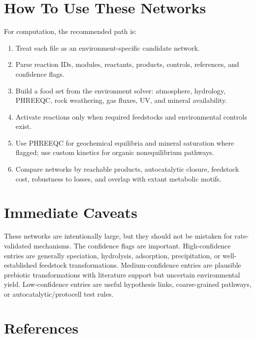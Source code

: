 \documentclass[11pt]{article}
\begin{document}
\section{How To Use These Networks}

For computation, the recommended path is:
\begin{enumerate}
\item Treat each file as an environment-specific candidate network.
\item Parse reaction IDs, modules, reactants, products, controls, references,
and confidence flags.
\item Build a food set from the environment solver: atmosphere, hydrology,
PHREEQC, rock weathering, gas fluxes, UV, and mineral availability.
\item Activate reactions only when required feedstocks and environmental
controls exist.
\item Use PHREEQC for geochemical equilibria and mineral saturation where
flagged; use custom kinetics for organic nonequilibrium pathways.
\item Compare networks by reachable products, autocatalytic closure,
feedstock cost, robustness to losses, and overlap with extant metabolic motifs.
\end{enumerate}

\section{Immediate Caveats}

These networks are intentionally large, but they should not be mistaken for
rate-validated mechanisms.  The confidence flags are important.  High-confidence
entries are generally speciation, hydrolysis, adsorption, precipitation, or
well-established feedstock transformations.  Medium-confidence entries are
plausible prebiotic transformations with literature support but uncertain
environmental yield.  Low-confidence entries are useful hypothesis links,
coarse-grained pathways, or autocatalytic/protocell test rules.

\section{References}
\end{document}
